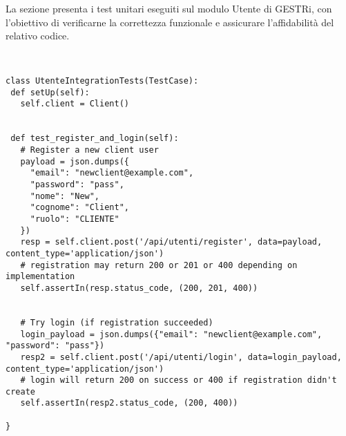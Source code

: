 \documentclass[a4paper]{report}
\begin{document}
\clearpage
\noindent
La sezione presenta i test unitari eseguiti sul modulo Utente di GESTRi, con l’obiettivo di verificarne la correttezza funzionale e assicurare l’affidabilità del relativo codice.

\begin{scriptsize}
\estiloPython
\begin{lstlisting}[caption={Utente}, label=lst:javacode]


class UtenteIntegrationTests(TestCase):
 def setUp(self):
   self.client = Client()


 def test_register_and_login(self):
   # Register a new client user
   payload = json.dumps({
     "email": "newclient@example.com",
     "password": "pass",
     "nome": "New",
     "cognome": "Client",
     "ruolo": "CLIENTE"
   })
   resp = self.client.post('/api/utenti/register', data=payload, content_type='application/json')
   # registration may return 200 or 201 or 400 depending on implementation
   self.assertIn(resp.status_code, (200, 201, 400))


   # Try login (if registration succeeded)
   login_payload = json.dumps({"email": "newclient@example.com", "password": "pass"})
   resp2 = self.client.post('/api/utenti/login', data=login_payload, content_type='application/json')
   # login will return 200 on success or 400 if registration didn't create
   self.assertIn(resp2.status_code, (200, 400))

}
\end{lstlisting}
\end{scriptsize}
\end{document}
